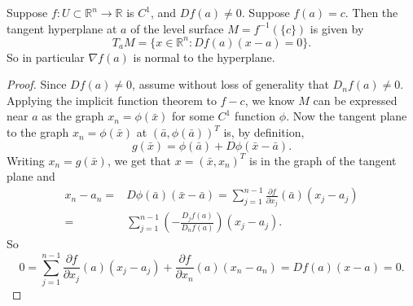 \documentclass[12pt]{article}
\begin{document}
\begin{proposition}
	Suppose $f:U\subset\mathbb{R}^n\to\mathbb{R}$ is $C^1$, and $Df(a)\neq 0$. Suppose $f(a)=c$. Then the tangent hyperplane at $a$ of the level surface $M=f^{-1}(\{c\})$ is given by 
	\begin{equation*}
		T_aM=\{x\in\mathbb{R}^n : Df(a)(x-a)=0\}.
	\end{equation*}
	So in particular $\nabla f(a)$ is normal to the hyperplane.
\end{proposition}
\begin{proof}
	Since $Df(a)\neq 0$, assume without loss of generality that $D_nf(a)\neq 0$. Applying the implicit function theorem to $f-c$, we know $M$ can be expressed near $a$ as the graph $x_n=\phi(\bar{x})$ for some $C^1$ function $\phi$. Now the tangent plane to the graph $x_n=\phi(\bar{x})$ at $(\bar{a}, \phi(\bar{a}))^T$ is, by definition, 
	\begin{equation*}
		g(\bar{x})=\phi(\bar{a})+D\phi(\bar{x}-\bar{a}).
	\end{equation*}
	Writing $x_n=g(\bar{x})$, we get that $x=(\bar{x}, x_n)^T$ is in the graph of the tangent plane and 
	\begin{align*}
		x_n-a_n
		=& D\phi(\bar{a})(\bar{x}-\bar{a}) = \sum_{j=1}^{n-1}\frac{\partial f}{\partial x_j}(\bar{a})(x_j-a_j) \\
		=& \sum_{j=1}^{n-1}\left(-\frac{D_jf(a)}{D_nf(a)}\right)(x_j-a_j).
	\end{align*}
	So 
	\begin{equation*}
		0 = \sum_{j=1}^{n-1}\frac{\partial f}{\partial x_j}(a)(x_j-a_j) + \frac{\partial f}{\partial x_n}(a)(x_n-a_n) = Df(a)(x-a) = 0.
	\end{equation*}
\end{proof}
\end{document}
